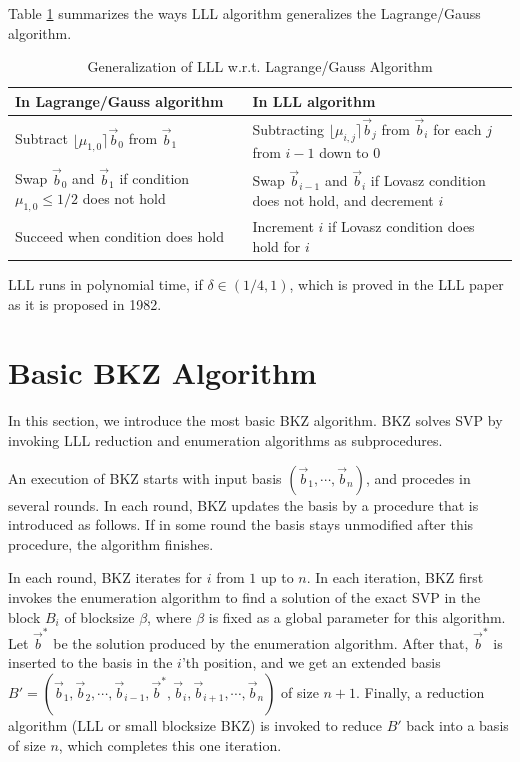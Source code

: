 \documentclass[11pt]{article}
\newcommand{\vb}{\vec{b}}
\newcommand{\vbs}{\vec{b}^*}
\begin{document}
Table \ref{tab:gen-lll} summarizes the ways LLL algorithm generalizes the Lagrange/Gauss algorithm.

\begin{table}[ht!]
\begin{tabular}{p{7cm}p{7cm}}
\hline
\textbf{In Lagrange/Gauss algorithm} & \textbf{In LLL algorithm} \\ \hline
Subtract $\lfloor\mu_{1,0}\rceil\vb_0$ from $\vb_1$ & Subtracting $\lfloor\mu_{i,j}\rceil\vb_j$ from $\vb_i$ for each $j$ from $i-1$ down to $0$ \\
Swap $\vb_0$ and $\vb_1$ if condition $\mu_{1,0}\leq1/2$ does not hold & Swap $\vb_{i-1}$ and $\vb_i$ if Lovasz condition does not hold, and decrement $i$ \\
Succeed when condition does hold & Increment $i$ if Lovasz condition does hold for $i$ \\ \hline
\end{tabular}
\caption{Generalization of LLL w.r.t. Lagrange/Gauss Algorithm}
\label{tab:gen-lll}
\end{table}

LLL runs in polynomial time, if $\delta\in(1/4,1)$, which is proved in the LLL paper \cite{lll1982factoring} as it is proposed in 1982.



\section{Basic BKZ Algorithm}
\label{sec:basic}

In this section, we introduce the most basic BKZ algorithm.
BKZ solves SVP by invoking LLL reduction and enumeration algorithms as subprocedures.

An execution of BKZ starts with input basis $(\vb_1,\cdots,\vb_n)$, and procedes in several rounds.
In each round, BKZ updates the basis by a procedure that is introduced as follows.
If in some round the basis stays unmodified after this procedure, the algorithm finishes.

In each round, BKZ iterates for $i$ from $1$ up to $n$.
In each iteration, BKZ first invokes the enumeration algorithm to find a solution of the exact SVP in the block $B_i$ of blocksize $\beta$, where $\beta$ is fixed as a global parameter for this algorithm.
Let $\vbs$ be the solution produced by the enumeration algorithm.
After that, $\vbs$ is inserted to the basis in the $i$'th position, and we get an extended basis $B'=(\vb_1,\vb_2,\cdots,\vb_{i-1},\vbs,\vb_i,\vb_{i+1},\cdots,\vb_n)$ of size $n+1$.
Finally, a reduction algorithm (LLL or small blocksize BKZ) is invoked to reduce $B'$ back into a basis of size $n$, which completes this one iteration.
\end{document}
